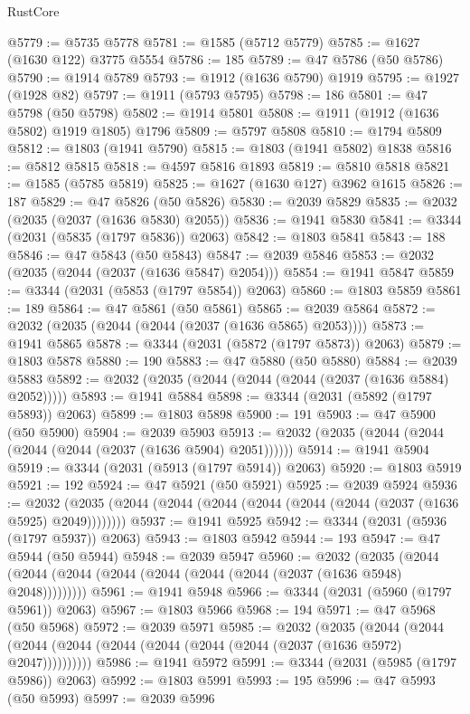 \begin{lexlean}{RustCore}
\begin{coremodule}
@5779 := @5735 @5778
@5781 := @1585 (@5712 @5779)
@5785 := @1627 (@1630 @122) @3775 @5554
@5786 := 185
@5789 := @47 @5786 (@50 @5786)
@5790 := @1914 @5789
@5793 := @1912 (@1636 @5790) @1919
@5795 := @1927 (@1928 @82)
@5797 := @1911 (@5793 @5795)
@5798 := 186
@5801 := @47 @5798 (@50 @5798)
@5802 := @1914 @5801
@5808 := @1911 (@1912 (@1636 @5802) @1919 @1805) @1796
@5809 := @5797 @5808
@5810 := @1794 @5809
@5812 := @1803 (@1941 @5790)
@5815 := @1803 (@1941 @5802) @1838
@5816 := @5812 @5815
@5818 := @4597 @5816 @1893
@5819 := @5810 @5818
@5821 := @1585 (@5785 @5819)
@5825 := @1627 (@1630 @127) @3962 @1615
@5826 := 187
@5829 := @47 @5826 (@50 @5826)
@5830 := @2039 @5829
@5835 := @2032 (@2035 (@2037 (@1636 @5830) @2055))
@5836 := @1941 @5830
@5841 := @3344 (@2031 (@5835 (@1797 @5836)) @2063)
@5842 := @1803 @5841
@5843 := 188
@5846 := @47 @5843 (@50 @5843)
@5847 := @2039 @5846
@5853 := @2032 (@2035 (@2044 (@2037 (@1636 @5847) @2054)))
@5854 := @1941 @5847
@5859 := @3344 (@2031 (@5853 (@1797 @5854)) @2063)
@5860 := @1803 @5859
@5861 := 189
@5864 := @47 @5861 (@50 @5861)
@5865 := @2039 @5864
@5872 := @2032 (@2035 (@2044 (@2044 (@2037 (@1636 @5865) @2053))))
@5873 := @1941 @5865
@5878 := @3344 (@2031 (@5872 (@1797 @5873)) @2063)
@5879 := @1803 @5878
@5880 := 190
@5883 := @47 @5880 (@50 @5880)
@5884 := @2039 @5883
@5892 := @2032 (@2035 (@2044 (@2044 (@2044 (@2037 (@1636 @5884) @2052)))))
@5893 := @1941 @5884
@5898 := @3344 (@2031 (@5892 (@1797 @5893)) @2063)
@5899 := @1803 @5898
@5900 := 191
@5903 := @47 @5900 (@50 @5900)
@5904 := @2039 @5903
@5913 := @2032 (@2035 (@2044 (@2044 (@2044 (@2044 (@2037 (@1636 @5904) @2051))))))
@5914 := @1941 @5904
@5919 := @3344 (@2031 (@5913 (@1797 @5914)) @2063)
@5920 := @1803 @5919
@5921 := 192
@5924 := @47 @5921 (@50 @5921)
@5925 := @2039 @5924
@5936 := @2032 (@2035 (@2044 (@2044 (@2044 (@2044 (@2044 (@2044 (@2037 (@1636 @5925) @2049))))))))
@5937 := @1941 @5925
@5942 := @3344 (@2031 (@5936 (@1797 @5937)) @2063)
@5943 := @1803 @5942
@5944 := 193
@5947 := @47 @5944 (@50 @5944)
@5948 := @2039 @5947
@5960 := @2032
    (@2035 (@2044 (@2044 (@2044 (@2044 (@2044 (@2044 (@2044 (@2037 (@1636 @5948) @2048)))))))))
@5961 := @1941 @5948
@5966 := @3344 (@2031 (@5960 (@1797 @5961)) @2063)
@5967 := @1803 @5966
@5968 := 194
@5971 := @47 @5968 (@50 @5968)
@5972 := @2039 @5971
@5985 := @2032
    (@2035
      (@2044 (@2044 (@2044 (@2044 (@2044 (@2044 (@2044 (@2044 (@2037 (@1636 @5972) @2047))))))))))
@5986 := @1941 @5972
@5991 := @3344 (@2031 (@5985 (@1797 @5986)) @2063)
@5992 := @1803 @5991
@5993 := 195
@5996 := @47 @5993 (@50 @5993)
@5997 := @2039 @5996

\end{coremodule}
\end{lexlean}
